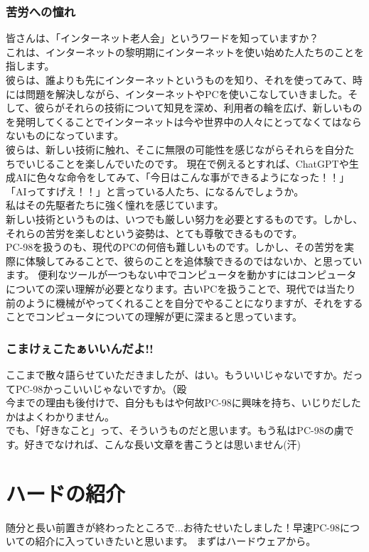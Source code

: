 \documentclass[b5paper,9pt,platex,dvipdfmx]{jsarticle}
\begin{document}
\begin{multicols*}{3}
\section[short]{苦労への憧れ}
皆さんは、「インターネット老人会」というワードを知っていますか？\\
これは、インターネットの黎明期にインターネットを使い始めた人たちのことを指します。\\
彼らは、誰よりも先にインターネットというものを知り、それを使ってみて、時には問題を解決しながら、インターネットやPCを使いこなしていきました。そして、彼らがそれらの技術について知見を深め、利用者の輪を広げ、新しいものを発明してくることでインターネットは今や世界中の人々にとってなくてはならないものになっています。\\
彼らは、新しい技術に触れ、そこに無限の可能性を感じながらそれらを自分たちでいじることを楽しんでいたのです。
現在で例えるとすれば、ChatGPTや生成AIに色々な命令をしてみて、「今日はこんな事ができるようになった！！」「AIってすげえ！！」と言っている人たち、になるんでしょうか。\\
私はその先駆者たちに強く憧れを感じています。\\
新しい技術というものは、いつでも厳しい努力を必要とするものです。しかし、それらの苦労を楽しむという姿勢は、とても尊敬できるものです。\\
PC-98を扱うのも、現代のPCの何倍も難しいものです。しかし、その苦労を実際に体験してみることで、彼らのことを追体験できるのではないか、と思っています。
便利なツールが一つもない中でコンピュータを動かすにはコンピュータについての深い理解が必要となります。古いPCを扱うことで、現代では当たり前のように機械がやってくれることを自分でやることになりますが、それをすることでコンピュータについての理解が更に深まると思っています。\\
\section[short]{こまけぇこたぁいいんだよ!!}
ここまで散々語らせていただきましたが、はい。もういいじゃないですか。だってPC-98かっこいいじゃないですか。（殴\\
今までの理由も後付けで、自分ももはや何故PC-98に興味を持ち、いじりだしたかはよくわかりません。\\
でも、「好きなこと」って、そういうものだと思います。もう私はPC-98の虜です。好きでなければ、こんな長い文章を書こうとは思いません(汗)
\part{ハードの紹介}
\setcounter{section}{0}
随分と長い前置きが終わったところで...お待たせいたしました！早速PC-98についての紹介に入っていきたいと思います。
まずはハードウェアから。

\end{multicols*}
\end{document}
